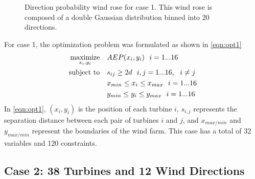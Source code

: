 \documentclass{jpconf}
\begin{document}
\begin{figure}[h!]
\begin{minipage}[t]{18pc}
\caption{Direction probability wind rose for case 1. This wind rose is composed of a double Gaussian distribution binned into 20 directions.}
\label{fig:directional}
\end{minipage} 
\end{figure}
%

For case 1, the optimization problem was formulated as shown in \cref{eqn:opt1}
%
\begin{equation}
	\label{eqn:opt1}
	\begin{aligned} [b]
	\underset{x_i,y_i}{\textrm{maximize}} \quad & AEP(x_i,y_i)~~i=1...16\\
	\textrm{subject to} \quad & s_{ij} \geq 2\*d~~i,j=1...16,~~i \neq j\\
	 & x_{min} \leq x_i \leq x_{max}~~i=1...16\\
     & y_{min} \leq y_i \leq y_{max}~~i=1...16
	\end{aligned}
\end{equation}
%
%
In \cref{eqn:opt1}, $(x_i,y_i)$ is the position of each turbine $i$, $s_{i,j}$ represents the separation distance between each pair of turbines $i$ and $j$, and $x_{max/min}$ and $y_{max/min}$ represent the boundaries of the wind farm. This case has a total of 32 variables and 120 constraints.

\subsection{Case 2: 38 Turbines and 12 Wind Directions}\label{sec:case2}
\end{document}
